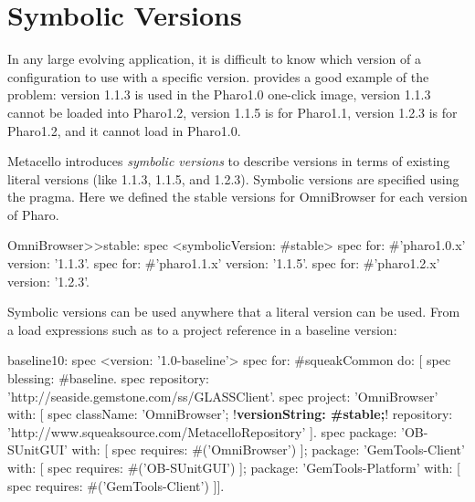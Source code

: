 \documentclass[a4paper,10pt,twoside]{book}
\begin{document}
%
%








\section{Symbolic Versions}
In any large evolving application, it is difficult to know which version of a configuration to use with a specific version. 
 provides a good example of the problem: version 1.1.3 is used in the Pharo1.0 one-click image,  version 1.1.3 cannot be loaded into Pharo1.2, version 1.1.5 is for Pharo1.1, version 1.2.3 is for Pharo1.2, and it cannot load in Pharo1.0. 

Metacello introduces \emph{symbolic versions} to describe versions in terms of existing literal versions (like 1.1.3, 1.1.5, and 1.2.3). Symbolic versions are specified using the  pragma. Here we defined the stable versions for OmniBrowser for each version of Pharo.

\begin{code}{}
OmniBrowser>>stable: spec
     <symbolicVersion: #stable>
     spec for: #'pharo1.0.x' version: '1.1.3'.
     spec for: #'pharo1.1.x' version: '1.1.5'.
     spec for: #'pharo1.2.x' version: '1.2.3'.
\end{code}

Symbolic versions can be used anywhere that a literal version can be used. From a load expressions such as 
to a project reference in a baseline version:

\begin{code}{}
baseline10: spec
     <version: '1.0-baseline'>
     spec for: #squeakCommon do: [
          spec blessing: #baseline.
          spec repository: 'http://seaside.gemstone.com/ss/GLASSClient'.
     spec
          project: 'OmniBrowser' with: [
          spec
               className: 'OmniBrowser';
               !\textbf{versionString: \#stable;}!
               repository: 'http://www.squeaksource.com/MetacelloRepository' ].
     spec
         package: 'OB-SUnitGUI' with: [
               spec requires: #('OmniBrowser') ];
         package: 'GemTools-Client' with: [
               spec requires: #('OB-SUnitGUI') ];
         package: 'GemTools-Platform' with: [
               spec requires: #('GemTools-Client') ]].
\end{code}
\end{document}
